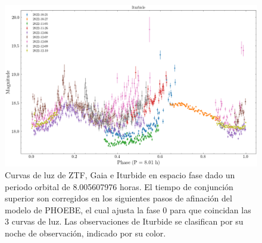 \begin{figure}[!h]
	\includegraphics[scale=0.4]{Metodologia/Secciones/AnalisisPeriodo/Figures/Iturbide Phase-Folded.png}

	\caption{Curvas de luz de ZTF, Gaia e Iturbide en espacio fase dado un
		periodo orbital de 8.005607976 horas. El tiempo de conjunción superior
		son corregidos en los siguientes pasos de afinación del modelo de
		PHOEBE, el cual ajusta la fase 0 para que coincidan las 3 curvas de luz.
		Las observaciones de Iturbide se clasifican por su noche de observación,
		indicado por su color.}
	\label{gaiaIturbideZtfPhaseFold}
\end{figure}